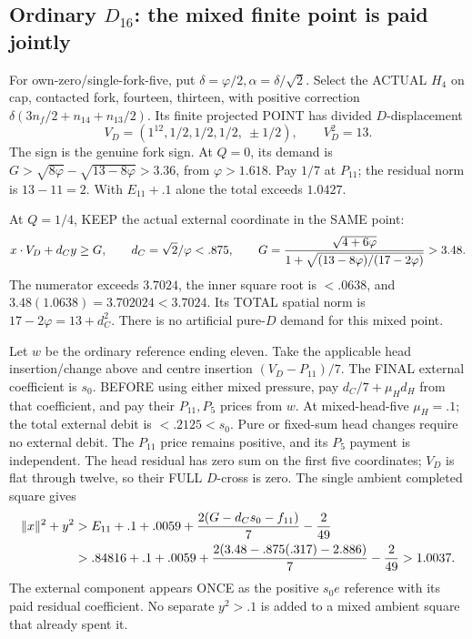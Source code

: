 \subsection{Ordinary \(D_{16}\): the mixed finite point is paid jointly}
\label{app:arithD16ordinarymixed}

For own-zero/single-fork-five, put
\(\delta=\varphi/2,\alpha=\delta/\sqrt2\).
Select the ACTUAL \(H_4\) on cap,
contacted fork, fourteen, thirteen, with
positive correction
\(\delta(3n_f/2+n_{14}+n_{13}/2)\).
Its finite projected POINT has divided
\(D\)-displacement
\[
                 V_D=(1^{12},1/2,1/2,1/2,\ \pm1/2),\qquad V_D^2=13 .
\]
The sign is the genuine fork sign.
At \(Q=0\), its demand is
\(G>\sqrt{8\varphi}-\sqrt{13-8\varphi}>3.36\),
from \(\varphi>1.618\).
Pay \(1/7\) at \(P_{11}\);
the residual norm is \(13-11=2\).
With \(E_{11}+.1\) alone the total
exceeds \(1.0427\).

At \(Q=1/4\), KEEP the actual external
coordinate in the SAME point:
\[
 x\cdot V_D+d_Cy\ge G,\qquad
 d_C=\sqrt2/\varphi<.875,\qquad
 G={\sqrt{4+6\varphi}\over
           1+\sqrt{(13-8\varphi)/(17-2\varphi)}}>3.48 .
\]
The numerator exceeds \(3.7024\), the
inner square root is \(<.0638\), and
\(3.48(1.0638)=3.702024<3.7024\).
Its TOTAL spatial norm is
\(17-2\varphi=13+d_C^2\).
There is no artificial pure-\(D\)
demand for this mixed point.

Let \(w\) be the ordinary reference
ending eleven.
Take the applicable head insertion/change
above and centre insertion
\((V_D-P_{11})/7\).
The FINAL external coefficient is \(s_0\).
BEFORE using either mixed pressure, pay
\(d_C/7+\mu_Hd_H\) from that coefficient,
and pay their \(P_{11},P_5\) prices
from \(w\).
At mixed-head-five \(\mu_H=.1\);
the total external debit is \(<.2125<s_0\).
Pure or fixed-sum head changes require
no external debit.
The \(P_{11}\) price remains positive,
and its \(P_5\) payment is independent.
The head residual has zero sum on
the first five coordinates; \(V_D\)
is flat through twelve, so their FULL
\(D\)-cross is zero.
The single ambient completed square gives
\[
 \begin{split}
 \|x\|^2+y^2
 &>E_{11}+.1+.0059+
           {2(G-d_Cs_0-f_{11})\over7}-{2\over49}\\
 &>.84816+.1+.0059+
           {2(3.48-.875(.317)-2.886)\over7}-{2\over49}>1.0037 .
 \end{split}
\]
The external component appears ONCE as
the positive \(s_0e\) reference with its
paid residual coefficient.
No separate \(y^2>.1\) is added to a
mixed ambient square that already spent it.

